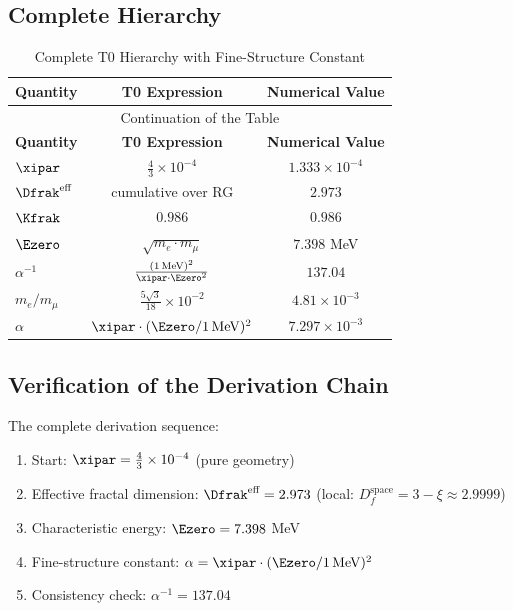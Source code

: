	\subsection{Complete Hierarchy}
	
	\begin{longtable}{lcc}
		\caption{Complete T0 Hierarchy with Fine-Structure Constant} \\
		\toprule
		\textbf{Quantity} & \textbf{T0 Expression} & \textbf{Numerical Value} \\
		\midrule
		\endfirsthead
		\multicolumn{3}{c}{Continuation of the Table} \\
		\toprule
		\textbf{Quantity} & \textbf{T0 Expression} & \textbf{Numerical Value} \\
		\midrule
		\endhead
		\bottomrule
		\endlastfoot
		$\xipar$ & $\frac{4}{3} \times 10^{-4}$ & $1.333 \times 10^{-4}$ \\
		$\Dfrak^{\text{eff}}$ & cumulative over RG & $2.973$ \\
		$\Kfrak$ & $0.986$ & $0.986$ \\
		$\Ezero$ & $\sqrt{m_e \cdot m_\mu}$ & $7.398$ MeV \\
		$\alpha^{-1}$ & $\frac{(1\,\text{MeV})^2}{\xipar \cdot \Ezero^2}$ & $137.04$ \\
		$m_e/m_\mu$ & $\frac{5\sqrt{3}}{18} \times 10^{-2}$ & $4.81 \times 10^{-3}$ \\
		$\alpha$ & $\xipar \cdot (\Ezero/1\,\text{MeV})^2$ & $7.297 \times 10^{-3}$ \\
	\end{longtable}
\normalsize
	
	\subsection{Verification of the Derivation Chain}
	
	The complete derivation sequence:
	\begin{enumerate}
		\item Start: $\xipar = \frac{4}{3} \times 10^{-4}$ (pure geometry)
		\item Effective fractal dimension: $\Dfrak^{\text{eff}} = 2.973$ (local: $D_f^{\text{space}} = 3 - \xi \approx 2.9999$)
		\item Characteristic energy: $\Ezero = 7.398$ MeV
		\item Fine-structure constant: $\alpha = \xipar \cdot (\Ezero/1\,\text{MeV})^2$
		\item Consistency check: $\alpha^{-1} = 137.04$ \checkmark
	\end{enumerate}
	
